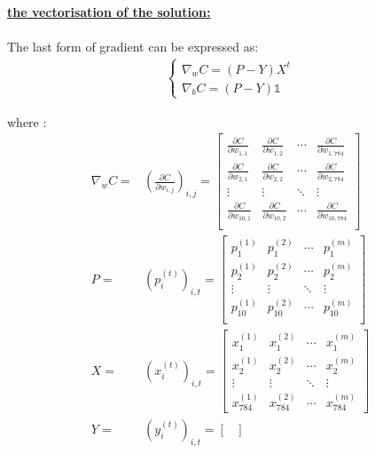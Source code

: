 \documentclass{article}
\begin{document}
\noindent \underline{\textbf{the  vectorisation of the  solution:}} \\ \\
\noindent The last form  of gradient  can be expressed  as:
\begin{align*}
\begin{cases}
\nabla_w C = (P-Y)X^{t}  \\
\nabla_b C = (P-Y)\mathbb{1}
\end{cases}
\end{align*}

where :
\begin{align*}
\nabla_w C =& \left(\frac{\partial C}{ \partial w_{i,j}} \right)_{i,j}
= \begin{bmatrix}
    \frac{\partial C}{ \partial w_{1,1}} & \frac{\partial C}{ \partial w_{1,2}} &\cdots & \frac{\partial C}{ \partial w_{1,784}}   \\
  \frac{\partial C}{ \partial w_{2,1}} & \frac{\partial C}{ \partial w_{2,2}} &\cdots & \frac{\partial C}{ \partial w_{2,784}}   \\
  \vdots & \vdots & \ddots  & \vdots \\
  \frac{\partial C}{ \partial w_{10,1}} & \frac{\partial C}{ \partial w_{10,2}} &\cdots & \frac{\partial C}{ \partial w_{10,784}}   \\
  \end{bmatrix}  \\
 P =& \left(p_i^{(t)} \right)_{i,t} =
\begin{bmatrix}
   p_1^{(1)} & p_1^{(2)}  &\cdots &  p_1^{(m)}  \\
   p_2^{(1)} & p_2^{(2)}  &\cdots &  p_2^{(m)}  \\
  \vdots & \vdots & \ddots  & \vdots \\
   p_{10}^{(1)} & p_{10}^{(2)}  &\cdots &  p_{10}^{(m)}  \\
  \end{bmatrix}  \\
   X =& \left(x_i^{(t)} \right)_{i,t} =
\begin{bmatrix}
   x_1^{(1)} & x_1^{(2)}  &\cdots &  x_1^{(m)}  \\
   x_2^{(1)} & x_2^{(2)}  &\cdots &  x_2^{(m)}  \\
  \vdots & \vdots & \ddots  & \vdots \\
   x_{784}^{(1)} & x_{784}^{(2)}  &\cdots &  x_{784}^{(m)}
  \end{bmatrix} \\
  Y =& \left(y_i^{(t)} \right)_{i,t} =
\begin{bmatrix}

\end{bmatrix}
\end{align*}
\end{document}
